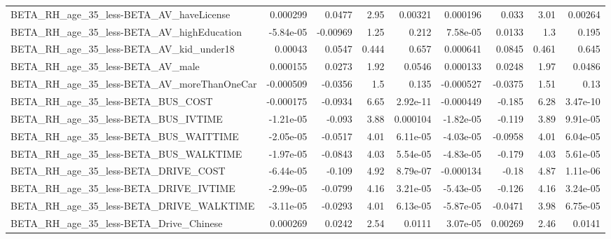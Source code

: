 \begin{tabular}{lrrrrrrrr}
BETA\_RH\_age\_35\_less-BETA\_AV\_haveLicense            &    0.000299 &       0.0477 &     2.95 &  0.00321 &   0.000196 &       0.033 &         3.01 &       0.00264 \\
BETA\_RH\_age\_35\_less-BETA\_AV\_highEducation          &   -5.84e-05 &     -0.00969 &     1.25 &    0.212 &   7.58e-05 &      0.0133 &          1.3 &         0.195 \\
BETA\_RH\_age\_35\_less-BETA\_AV\_kid\_under18            &     0.00043 &       0.0547 &    0.444 &    0.657 &   0.000641 &      0.0845 &        0.461 &         0.645 \\
BETA\_RH\_age\_35\_less-BETA\_AV\_male                   &    0.000155 &       0.0273 &     1.92 &   0.0546 &   0.000133 &      0.0248 &         1.97 &        0.0486 \\
BETA\_RH\_age\_35\_less-BETA\_AV\_moreThanOneCar         &   -0.000509 &      -0.0356 &      1.5 &    0.135 &  -0.000527 &     -0.0375 &         1.51 &          0.13 \\
BETA\_RH\_age\_35\_less-BETA\_BUS\_COST                  &   -0.000175 &      -0.0934 &     6.65 & 2.92e-11 &  -0.000449 &      -0.185 &         6.28 &      3.47e-10 \\
BETA\_RH\_age\_35\_less-BETA\_BUS\_IVTIME                &   -1.21e-05 &       -0.093 &     3.88 & 0.000104 &  -1.82e-05 &      -0.119 &         3.89 &      9.91e-05 \\
BETA\_RH\_age\_35\_less-BETA\_BUS\_WAITTIME              &   -2.05e-05 &      -0.0517 &     4.01 & 6.11e-05 &  -4.03e-05 &     -0.0958 &         4.01 &      6.04e-05 \\
BETA\_RH\_age\_35\_less-BETA\_BUS\_WALKTIME              &   -1.97e-05 &      -0.0843 &     4.03 & 5.54e-05 &  -4.83e-05 &      -0.179 &         4.03 &      5.61e-05 \\
BETA\_RH\_age\_35\_less-BETA\_DRIVE\_COST                &   -6.44e-05 &       -0.109 &     4.92 & 8.79e-07 &  -0.000134 &       -0.18 &         4.87 &      1.11e-06 \\
BETA\_RH\_age\_35\_less-BETA\_DRIVE\_IVTIME              &   -2.99e-05 &      -0.0799 &     4.16 & 3.21e-05 &  -5.43e-05 &      -0.126 &         4.16 &      3.24e-05 \\
BETA\_RH\_age\_35\_less-BETA\_DRIVE\_WALKTIME            &   -3.11e-05 &      -0.0293 &     4.01 & 6.13e-05 &  -5.87e-05 &     -0.0471 &         3.98 &      6.75e-05 \\
BETA\_RH\_age\_35\_less-BETA\_Drive\_Chinese             &    0.000269 &       0.0242 &     2.54 &   0.0111 &   3.07e-05 &     0.00269 &         2.46 &        0.0141 \\

\end{tabular}
